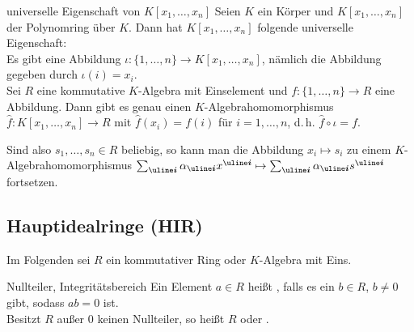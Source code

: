 \begin{Satz}{universelle Eigenschaft von $K[x_1, \dotsc, x_n]$}
    Seien $K$ ein Körper und
    $K[x_1, \dotsc, x_n]$ der Polynomring über $K$.
    Dann hat $K[x_1, \dotsc, x_n]$ folgende universelle Eigenschaft: \\
    Es gibt eine Abbildung
    $\iota: \{1, \dotsc, n\} \rightarrow K[x_1, \dotsc, x_n]$,
    nämlich die Abbildung gegeben durch $\iota(i) = x_i$. \\
    Sei $R$ eine kommutative $K$-Algebra mit Einselement und
    $f: \{1, \dotsc, n\} \rightarrow R$ eine Abbildung.
    Dann gibt es genau einen $K$-Algebrahomomorphismus
    $\widehat{f}: K[x_1, \dotsc, x_n] \rightarrow R$ mit
    $\widehat{f}(x_i) = f(i)$ für $i = 1, \dotsc, n$,
    d.\,h. $\widehat{f} \circ \iota = f$.
\end{Satz}

\begin{Bem}
    Sind also $s_1, \dotsc, s_n \in R$ beliebig, so kann man
    die Abbildung $x_i \mapsto s_i$ zu einem $K$-Algebrahomo\-morphismus
    $\sum_{\mi{i}} \alpha_{\mi{i}} x^{\mi{i}} \mapsto
    \sum_{\mi{i}} \alpha_{\mi{i}} s^{\mi{i}}$ fortsetzen.
\end{Bem}

\subsection{%
    Hauptidealringe (HIR)%
}

\begin{Bem}
    Im Folgenden sei $R$ ein kommutativer Ring oder $K$-Algebra mit Eins.
\end{Bem}

\begin{Def}{Nullteiler, Integritätsbereich}
    Ein Element $a \in R$ heißt , falls
    es ein $b \in R$, $b \not= 0$ gibt, sodass $ab = 0$ ist. \\
    Besitzt $R$ außer $0$ keinen Nullteiler, so heißt
    $R$  oder .
\end{Def}

